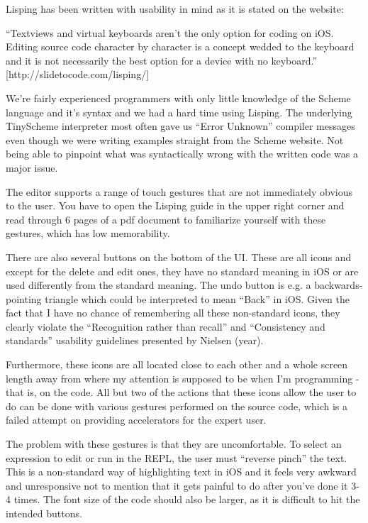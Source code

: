 Lisping has been written with usability in mind as it is stated on the website: 

“Textviews and virtual keyboards aren't the only option for coding on iOS. Editing source code character by character is a concept wedded to the keyboard and it is not necessarily the best option for a device with no keyboard.” [http://slidetocode.com/lisping/]

We’re fairly experienced programmers with only little knowledge of the Scheme language and it’s syntax and we had a hard time using Lisping. The underlying TinyScheme interpreter most often gave us “Error Unknown” compiler messages even though we were writing examples straight from the Scheme website. Not being able to pinpoint what was syntactically wrong with the written code was a major issue.

The editor supports a range of touch gestures that are not immediately obvious to the user. You have to open the Lisping guide in the upper right corner and read through 6 pages of a pdf document to familiarize yourself with these gestures, which has low memorability.

There are also several buttons on the bottom of the UI. These are all icons and except for the delete and edit ones, they have no standard meaning in iOS or are used differently from the standard meaning. The undo button is e.g. a backwards-pointing triangle which could be interpreted to mean “Back” in iOS. Given the fact that I have no chance of remembering all these non-standard icons, they clearly violate the “Recognition rather than recall” and “Consistency and standards” usability guidelines presented by Nielsen (year). 

Furthermore, these icons are all located close to each other and a whole screen length away from where my attention is supposed to be when I’m programming - that is, on the code. All but two of the actions that these icons allow the user to do can be done with various gestures performed on the source code, which is a failed attempt on providing accelerators for the expert user.

The problem with these gestures is that they are uncomfortable. To select an expression to edit or run in the REPL, the user must “reverse pinch” the text. This is a non-standard way of highlighting text in iOS and it feels very awkward and unresponsive not to mention that it gets painful to do after you’ve done it 3-4 times. The font size of the code should also be larger, as it is difficult to hit the intended buttons.

